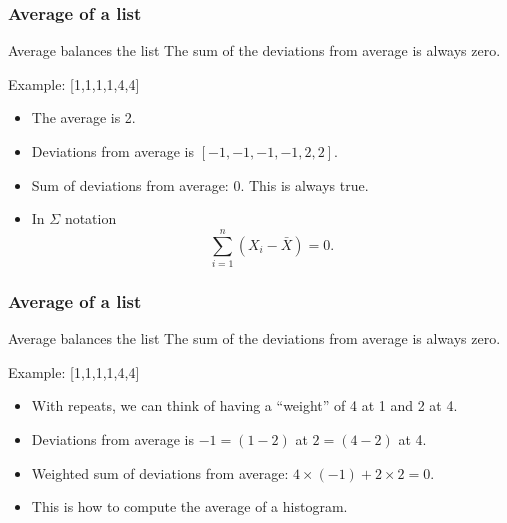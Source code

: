 \documentclass[handout]{beamer}
\begin{document}
   \begin{frame} \frametitle{Average of a list}

   \begin{block}
   {Average balances the list}
   The sum of the deviations from average is always zero.

   \end{block}

   \begin{block}
   {Example: [1,1,1,1,4,4]}


   \begin{itemize}
   \item The average is 2.

   \item Deviations from average is $[-1,-1,-1,-1,2,2]$.

   \item Sum of deviations from average: 0. This is always true.

   \item In $\Sigma$ notation
   $$
   \sum_{i=1}^n (X_i - \bar{X}) = 0.
   $$

   \end{itemize}
   \end{block}
   \end{frame}


   \begin{frame} \frametitle{Average of a list}

   \begin{block}
   {Average balances the list}
   The sum of the deviations from average is always zero.

   \end{block}

   \begin{block}
   {Example: [1,1,1,1,4,4]}


   \begin{itemize}
   \item With repeats, we can think of having a ``weight'' of 4 at 1 and 2 at 4.

   \item Deviations from average is $-1=(1-2)$ at $2=(4-2)$ at 4.

   \item Weighted sum of deviations from average: $4 \times (-1) + 2 \times 2 = 0$.

   \item This is how to compute the average of a histogram.

   \end{itemize}
   \end{block}
   \end{frame}
\end{document}
